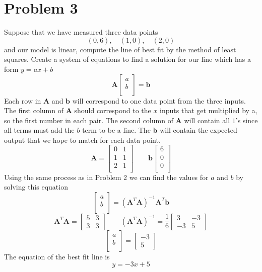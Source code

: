 \documentclass{article}
\begin{document}
\section*{Problem 3}
Suppose that we have measured three data points
$$ (0,6), \quad (1,0), \quad (2,0)$$
and our model is linear, compute the line of best fit by the method of least squares.
\newline
\newline
Create a system of equations to find a solution for our line which has a form $y = ax+b$
$$
\mathbf{A}
\begin{bmatrix}
a\\
b\\
\end{bmatrix}
=
\mathbf{b}
$$
Each row in $\mathbf{A}$ and $\mathbf{b}$ will correspond to one data point from the three inputs.
The first column of $\mathbf{A}$ should correspond to the $x$ inputs that get multiplied by a, so the first number in each pair.
The second column of $\mathbf{A}$ will contain all $1$'s since all terms must add the $b$ term to be a line.
The $\mathbf{b}$ will contain the expected output that we hope to match for each data point.
$$
\mathbf{A}
=
\begin{bmatrix}
0 & 1 \\
1 & 1 \\
2 & 1 \\
\end{bmatrix}
\qquad
\mathbf{b}
\begin{bmatrix}
6 \\
0 \\
0 \\
\end{bmatrix}
$$
Using the same process as in Problem 2 we can find the values for $a$ and $b$ by solving this equation
$$
\begin{bmatrix}
a \\
b \\
\end{bmatrix}
=(\mathbf{A}^T\mathbf{A})^{-1}\mathbf{A}^T\mathbf{b}
$$
$$
\mathbf{A}^T\mathbf{A}
=
\begin{bmatrix}
5 & 3 \\
3 & 3
\end{bmatrix}
\qquad
(\mathbf{A}^T\mathbf{A})^{-1}
=
\frac{1}{6}
\begin{bmatrix}
3 & -3 \\
-3 & 5
\end{bmatrix}
$$
$$
\begin{bmatrix}
a \\
b \\
\end{bmatrix}
=
\begin{bmatrix}
-3 \\
5
\end{bmatrix}
$$
The equation of the best fit line is
$$ y = -3x + 5 $$
\end{document}
